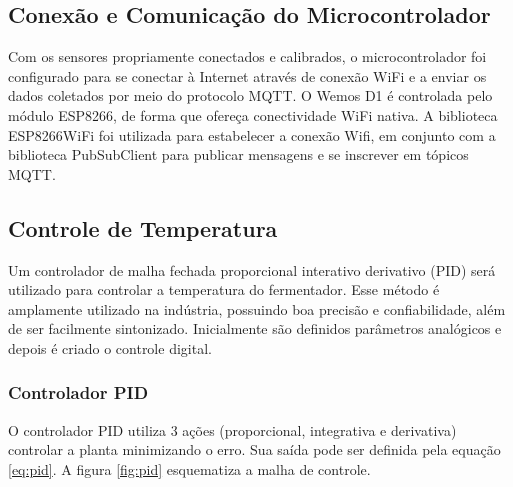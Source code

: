 




\subsection{Conexão e Comunicação do Microcontrolador}

Com os sensores propriamente conectados e calibrados, o microcontrolador foi configurado para se conectar à Internet através de conexão WiFi e a enviar os dados coletados por meio do protocolo MQTT. O Wemos D1 é controlada pelo módulo ESP8266, de forma que ofereça conectividade WiFi nativa. 
A biblioteca ESP8266WiFi foi utilizada para estabelecer a conexão Wifi, em conjunto com a biblioteca PubSubClient para publicar mensagens e se inscrever em tópicos MQTT. 



\subsection{Controle de Temperatura}

Um controlador de malha fechada proporcional interativo derivativo (PID) será utilizado para controlar a temperatura do fermentador. Esse método é amplamente utilizado na indústria, possuindo boa precisão e confiabilidade, além de ser facilmente sintonizado. Inicialmente são definidos parâmetros analógicos e depois é criado o controle digital.


\subsubsection*{Controlador PID}

O controlador PID utiliza 3 ações (proporcional, integrativa e derivativa) controlar a planta minimizando o erro. Sua saída pode ser definida pela equação \ref{eq:pid}. A figura \ref{fig:pid} esquematiza a malha de controle.

